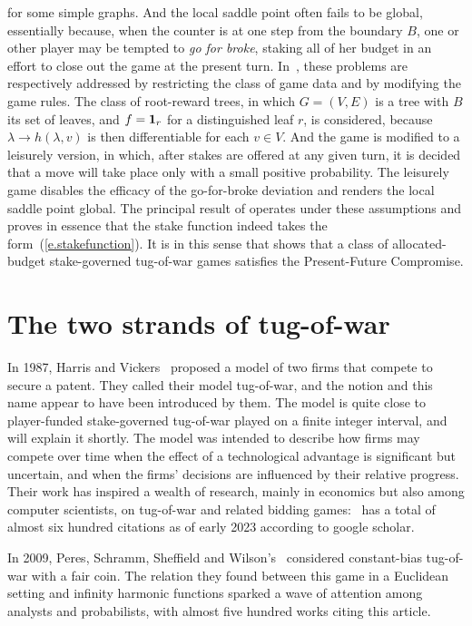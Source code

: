 \documentclass[letterpaper,11pt,oneside,reqno]{amsbook}
\numberwithin{figure}{chapter}
\theoremstyle{definition}
\theoremstyle{definition}
\theoremstyle{definition}
\theoremstyle{definition}
\theoremstyle{definition}
\begin{document}
for some simple graphs. And the local saddle point often fails to be global, essentially because, when the counter is at one step from the boundary $B$, one or other player may be tempted to {\em go for broke}, staking all of her budget in an effort to close out the game at the present turn. In~\cite{HP2022}, these problems are respectively addressed by restricting the class of game data and by modifying the game rules. The class of root-reward trees, in which $G = (V,E)$ is a tree with $B$ its set of leaves, and $f = {\bf 1}_r$ for a distinguished leaf $r$, is considered, because $\lambda \to h(\lambda,v)$ is then differentiable for each $v \in V$. And the game is modified to a leisurely version, in which, after stakes are offered at any given turn, it is decided that a move will take place only with a small positive probability. The leisurely game disables the efficacy of the go-for-broke deviation and renders the local saddle point global. The principal result of \cite{HP2022} operates under these assumptions and proves in essence that the stake function indeed takes the form~(\ref{e.stakefunction}). It is in this sense that \cite{HP2022} shows that a class of allocated-budget stake-governed tug-of-war games satisfies the Present-Future Compromise.


\section{The two strands of tug-of-war}\label{s.gamespde}


In 1987, Harris and Vickers~\cite{HarrisVickers87} 
proposed a model of two firms that compete to secure a patent.
They called their model tug-of-war, and the notion and this name appear to have been introduced by them. The model is quite close to player-funded stake-governed tug-of-war played on a finite integer interval, and will explain it shortly. The model was intended to describe how firms may compete over time when the effect of a technological advantage is significant but uncertain, and when the firms' decisions are influenced by their relative progress. Their work has inspired a wealth of research, mainly in economics but also among computer scientists, on tug-of-war and related bidding games:~\cite{HarrisVickers87} has a total of almost six hundred citations as of early 2023 according to google scholar.

In 2009, Peres, Schramm, Sheffield and Wilson's~\cite{PSSW09} considered constant-bias tug-of-war with a fair coin. The relation they found between this game in a Euclidean setting and infinity harmonic functions sparked a wave of attention among analysts and probabilists, with almost five hundred works citing this article.
\end{document}
